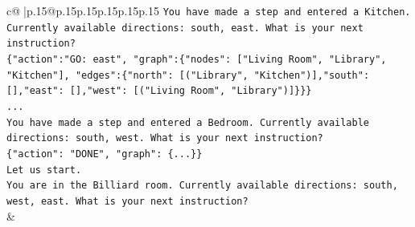 \documentclass{article}
\begin{document}
{\begin{supertabular}{c@{$\;$}|p{.15\linewidth}@{}p{.15\linewidth}p{.15\linewidth}p{.15\linewidth}p{.15\linewidth}p{.15\linewidth}}
{{{\texttt{You have made a step and entered a Kitchen. Currently available directions: south, east. What is your next instruction?} \\
\texttt{\{"action":"GO: east", "graph":\{"nodes": {[}"Living Room", "Library", "Kitchen"{]}, "edges":\{"north": {[}("Library", "Kitchen"){]},"south": {[}{]},"east": {[}{]},"west": {[}("Living Room", "Library"){]}\}\}\}} \\
\texttt{...} \\
\texttt{You have made a step and entered a Bedroom. Currently available directions: south, west. What is your next instruction?} \\
\texttt{\{"action": "DONE", "graph": \{...\}\}} \\
\texttt{Let us start.} \\
\texttt{You are in the Billiard room. Currently available directions: south, west, east. What is your next instruction?} \\
            }
        }
    }
    & \\ \\


\end{supertabular}}
\end{document}
